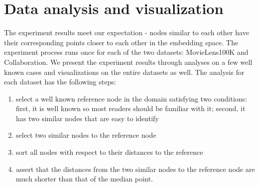 \documentclass[conference]{IEEEtran}
\begin{document}
\section{Data analysis and visualization}
The experiment results meet our expectation - nodes similar to each other have their corresponding points closer to each other in the embedding space.
The experiment process runs once for each of the two datasets: MovieLens100K and Collaboration.
We present the experiment results through analyses on a few well known cases and visualizations on the entire datasets as well.
The analysis for each dataset has the following steps:
\begin{enumerate}
	\item select a well known reference node in the domain satisfying two conditions: first, it is well known so most readers should be familiar with it; second, it has two similar nodes that are easy to identify
	\item select two similar nodes to the reference node
	\item sort all nodes with respect to their distances to the reference
	\item assert that the distances from the two similar nodes to the reference node are much shorter than that of the median point.
\end{enumerate}
\end{document}
